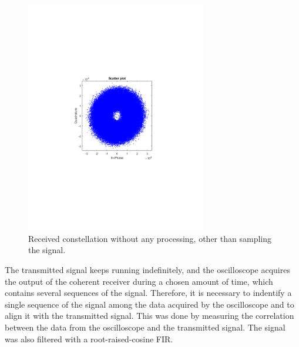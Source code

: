 \begin{figure}[H]
	\centering
	\includegraphics[clip, trim=4cm 8cm 4cm 8cm, width=0.7\textwidth]{./sdf/m_qam_system/figures/exp/const-rtx-sps.pdf}
	\caption{Received constellation without any processing, other than sampling the signal.}
	\label{fig:rxConst}
\end{figure}

The transmitted signal keeps running indefinitely, and the oscilloscope acquires the output of the coherent receiver during a chosen amount of time, which contains several sequences of the signal. Therefore, it is necessary to indentify a single sequence of the signal among the data acquired by the oscilloscope and to align it with the transmitted signal. This was done by measuring the correlation between the data from the oscilloscope and the transmitted signal. The signal was also filtered with a root-raised-cosine FIR.

